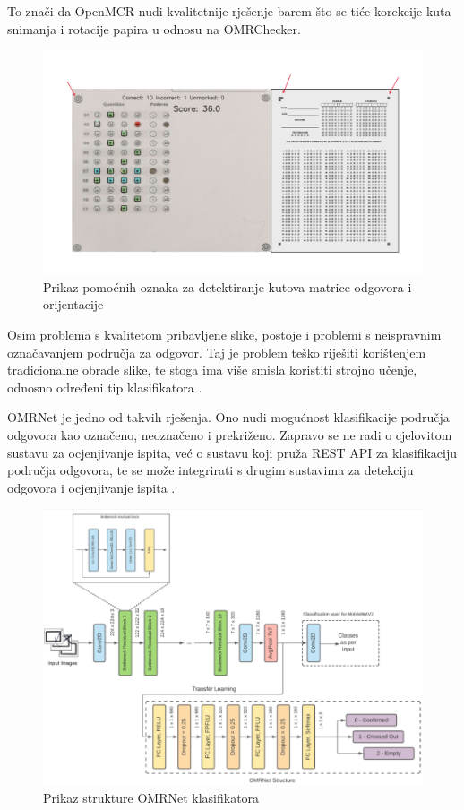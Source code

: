 \documentclass{foi}
\begin{document}
To znači da OpenMCR nudi kvalitetnije rješenje barem što se tiće korekcije kuta snimanja i rotacije papira u odnosu na OMRChecker.

\begin{figure}[H]
    \centering
    \includegraphics[width=0.9\linewidth]{slike/CornerDetection.png}
    \caption{Prikaz pomoćnih oznaka za detektiranje kutova matrice odgovora i orijentacije \cite{OMRChecker} \cite{OpenMCr}}
\end{figure}

Osim problema s kvalitetom pribavljene slike, postoje i problemi s neispravnim označavanjem područja za odgovor. Taj je problem teško riješiti korištenjem tradicionalne obrade slike, te stoga ima više smisla koristiti strojno učenje, odnosno određeni tip klasifikatora \cite{omrnet}.

OMRNet je jedno od takvih rješenja. Ono nudi mogućnost klasifikacije područja odgovora kao označeno, neoznačeno i prekriženo. Zapravo se ne radi o cjelovitom sustavu za ocjenjivanje ispita, već o sustavu koji pruža REST API za klasifikaciju područja odgovora, te se može integrirati s drugim sustavima za detekciju odgovora i ocjenjivanje ispita \cite{omrnet}.

\begin{figure}[H]
    \centering
    \includegraphics[width=0.7\linewidth]{slike/OMRNet.png}
    \caption{Prikaz strukture OMRNet klasifikatora \cite{omrnet}}
\end{figure}
\end{document}
